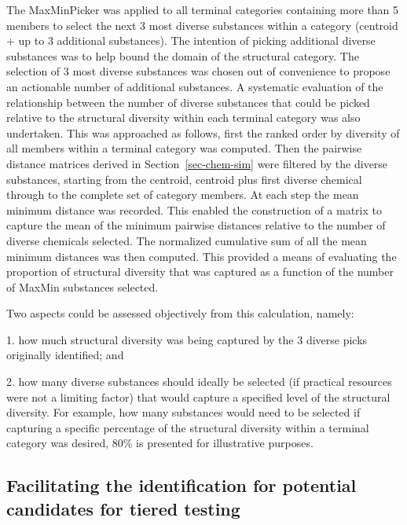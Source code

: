 \documentclass[
  super,
  preprint,
  3p]{elsarticle}
\begin{document}
The MaxMinPicker was applied to all terminal categories containing more
than 5 members to select the next 3 most diverse substances within a
category (centroid + up to 3 additional substances). The intention of
picking additional diverse substances was to help bound the domain of
the structural category. The selection of 3 most diverse substances was
chosen out of convenience to propose an actionable number of additional
substances. A systematic evaluation of the relationship between the
number of diverse substances that could be picked relative to the
structural diversity within each terminal category was also undertaken.
This was approached as follows, first the ranked order by diversity of
all members within a terminal category was computed. Then the pairwise
distance matrices derived in Section~\ref{sec-chem-sim} were filtered by
the diverse substances, starting from the centroid, centroid plus first
diverse chemical through to the complete set of category members. At
each step the mean minimum distance was recorded. This enabled the
construction of a matrix to capture the mean of the minimum pairwise
distances relative to the number of diverse chemicals selected. The
normalized cumulative sum of all the mean minimum distances was then
computed. This provided a means of evaluating the proportion of
structural diversity that was captured as a function of the number of
MaxMin substances selected.

Two aspects could be assessed objectively from this calculation, namely:

1. how much structural diversity was being captured by the 3 diverse
picks originally identified; and

2. how many diverse substances should ideally be selected (if practical
resources were not a limiting factor) that would capture a specified
level of the structural diversity. For example, how many substances
would need to be selected if capturing a specific percentage of the
structural diversity within a terminal category was desired, 80\% is
presented for illustrative purposes.

\hypertarget{facilitating-the-identification-for-potential-candidates-for-tiered-testing}{%
\subsection{Facilitating the identification for potential candidates for
tiered
testing}\label{facilitating-the-identification-for-potential-candidates-for-tiered-testing}}
\end{document}
